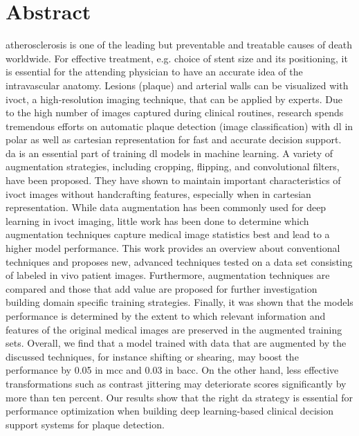 \chapter{Abstract}

\Gls{atherosclerosis} is one of the leading but preventable and treatable causes of death worldwide. For effective treatment, e.g. choice of stent size and its positioning, it is essential for the attending physician to have an accurate idea of the intravascular anatomy. Lesions (plaque) and arterial walls can be visualized with \acrfull{ivoct}, a high-resolution imaging technique, that can be applied by experts. Due to the high number of images captured during clinical routines, research spends tremendous efforts on automatic plaque detection (image classification) with \acrfull{dl} in polar as well as cartesian representation for fast and accurate decision support. \Acrfull{da} is an essential part of training \acrshort{dl} models in machine learning. A variety of augmentation strategies, including cropping, flipping, and convolutional filters, have been proposed. They have shown to maintain important characteristics of \acrshort{ivoct} images without handcrafting features, especially when in cartesian representation. While data augmentation has been commonly used for deep learning in \acrshort{ivoct} imaging, little work has been done to determine which augmentation techniques capture medical image statistics best and lead to a higher model performance. This work provides an overview about conventional techniques and proposes new, advanced techniques tested on a data set consisting of labeled in vivo patient images. Furthermore, augmentation techniques are compared and those that add value are proposed for further investigation building domain specific training strategies. Finally, it was shown that the models performance is determined by the extent to which relevant information and features of the original medical images are preserved in the augmented training sets. Overall, we find that a model trained with data that are augmented by the discussed techniques, for instance shifting or shearing, may boost the performance by 0.05 in \acrfull{mcc} and 0.03 in \acrfull{bacc}. On the other hand, less effective transformations such as contrast jittering may deteriorate scores significantly by more than ten percent. Our results show that the right \acrshort{da} strategy is essential for performance optimization when building deep learning-based clinical decision support systems for plaque detection.



